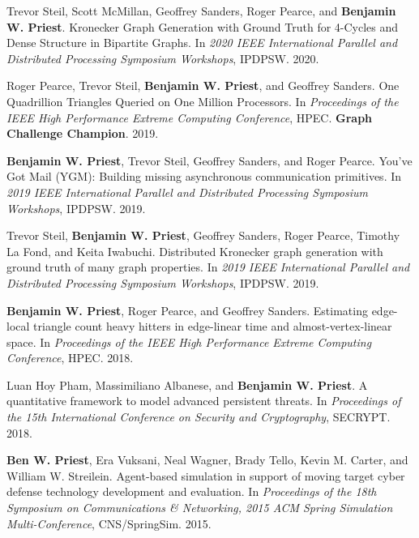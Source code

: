 \documentclass[10pt]{article}
\begin{document}
\begin{bibenum}

\item Trevor Steil, Scott McMillan, Geoffrey Sanders, Roger Pearce, and \textbf{Benjamin W. Priest}.
	Kronecker Graph Generation with Ground Truth for 4-Cycles and Dense Structure in Bipartite Graphs.
	In \emph{2020 IEEE International Parallel and Distributed Processing Symposium Workshops}, 
	IPDPSW. 
	2020.

\item Roger Pearce, Trevor Steil, \textbf{Benjamin W. Priest}, and Geoffrey Sanders.
	One Quadrillion Triangles Queried on One Million Processors.
	In \emph{Proceedings of the IEEE High Performance Extreme Computing Conference}, 
	HPEC. 
	\textbf{Graph Challenge Champion}.
	2019.

\item \textbf{Benjamin W. Priest}, Trevor Steil, Geoffrey Sanders, and Roger Pearce.
	You've {G}ot {M}ail (YGM): Building missing asynchronous communication primitives.
	In \emph{2019 IEEE International Parallel and Distributed Processing Symposium Workshops}, 
	IPDPSW. 
	2019.

\item Trevor Steil, \textbf{Benjamin W. Priest}, Geoffrey Sanders, Roger Pearce, Timothy La Fond, and Keita Iwabuchi.
	Distributed Kronecker graph generation with ground truth of many graph properties.
	In \emph{2019 IEEE International Parallel and Distributed Processing Symposium Workshops}, 
	IPDPSW. 
	2019.

\item \textbf{Benjamin W. Priest}, Roger Pearce, and Geoffrey Sanders.
	Estimating edge-local triangle count heavy hitters in edge-linear time and almost-vertex-linear space.
	In \emph{Proceedings of the IEEE High Performance Extreme Computing Conference}, 
	HPEC. 
	2018.

\item Luan Hoy Pham, Massimiliano Albanese, and \textbf{Benjamin W. Priest}.
	A quantitative framework to model advanced persistent threats.
	In \emph{Proceedings of the 15th International Conference on Security and Cryptography}, 
	SECRYPT. 
	2018.

\item \textbf{Ben W. Priest}, Era Vuksani, Neal Wagner, Brady Tello, Kevin M. Carter, and William W. Streilein. 
	Agent-based simulation in support of moving target cyber defense technology development and evaluation.
	In \emph{Proceedings of the 18th Symposium on Communications \& Networking, 2015 ACM Spring Simulation Multi-Conference}, 
	CNS/SpringSim. 
	2015.


\end{bibenum}
\end{document}
